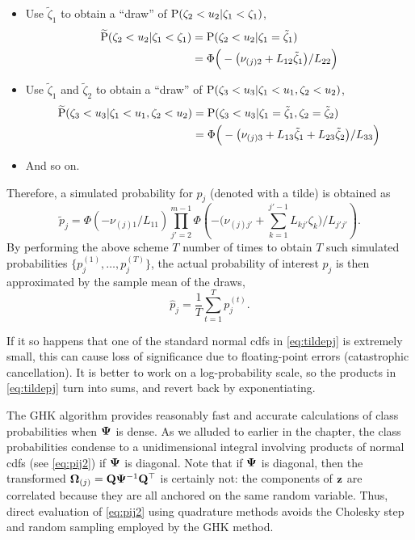 \begin{itemize}
  \item Use $\tilde\zeta_1$ to obtain a ``draw'' of $\operatorname{P}(\zeta_2 < u_2|\zeta_1 < \zeta_1)$,
  \begin{align*}
    \widetilde{\operatorname{P}}(\zeta_2 < u_2|\zeta_1 < \zeta_1)
    &=\operatorname{P}(\zeta_2 < u_2|\zeta_1 = \tilde\zeta_1) \\
    &= \Phi \Big( - \big(\nu_{(j)2} +  L_{12}\tilde\zeta_1 \big) / L_{22} \Big)
  \end{align*}
  \item Use $\tilde\zeta_1$ and $\tilde\zeta_2$ to obtain a ``draw'' of $\operatorname{P}(\zeta_3 < u_3|\zeta_1 < u_1,\zeta_2 < u_2)$,
  \begin{align*}
    \widetilde{\operatorname{P}}(\zeta_3 < u_3|\zeta_1 < u_1,\zeta_2 < u_2)
    &=\operatorname{P}(\zeta_3 < u_3|\zeta_1 = \tilde\zeta_1,\zeta_2 = \tilde\zeta_2)\\
    &= \Phi \Big( - \big(\nu_{(j)3} + L_{13}\tilde\zeta_1 + L_{23}\tilde\zeta_2 \big) / L_{33} \Big)
  \end{align*} 
  \item And so on. 
\end{itemize}
Therefore, a simulated probability for $p_j$ (denoted with a tilde) is obtained as
\begin{equation}\label{eq:tildepj}
  \tilde p_j = \Phi\left( -\nu_{(j)1}/ L_{11} \right) 
  \prod_{j'=2}^{m-1} \Phi \left( 
  - \big(\nu_{(j)j'} + \textstyle\sum_{k=1}^{j'-1} L_{kj'}\zeta_k \big) / L_{j'j'} 
  \right).
\end{equation}
By performing the above scheme $T$ number of times to obtain $T$ such simulated probabilities $\{p_j^{(1)},\dots,p_j^{(T)} \}$, the actual probability of interest $p_j$ is then approximated by the sample mean of the draws,
\[
  \hat p_j = \frac{1}{T} \sum_{t=1}^T p_j^{(t)}.
\]

If it so happens that one of the standard normal cdfs in \cref{eq:tildepj} is extremely small, this can cause loss of significance due to floating-point errors (catastrophic cancellation).
It is better to work on a log-probability scale, so the products in \cref{eq:tildepj} turn into sums, and revert back by exponentiating.

\begin{remark}
  The GHK algorithm provides reasonably fast and accurate calculations of class probabilities when ${\bm\Psi}$ is dense.
  As we alluded to earlier in the chapter, the class probabilities condense to a unidimensional integral involving products of normal cdfs (see \cref{eq:pij2}) if ${\bm\Psi}$ is diagonal.
  Note that if ${\bm\Psi}$ is diagonal, then the transformed ${\bm\Omega}_{(j)} = {\mathbf Q}{\bm\Psi}^{-1}{\mathbf Q}^\top$ is certainly not: the components of ${\mathbf z}$ are correlated because they are all anchored on the same random variable.
  Thus, direct evaluation of \cref{eq:pij2} using quadrature methods avoids the Cholesky step and random sampling employed by the GHK method.
\end{remark}

